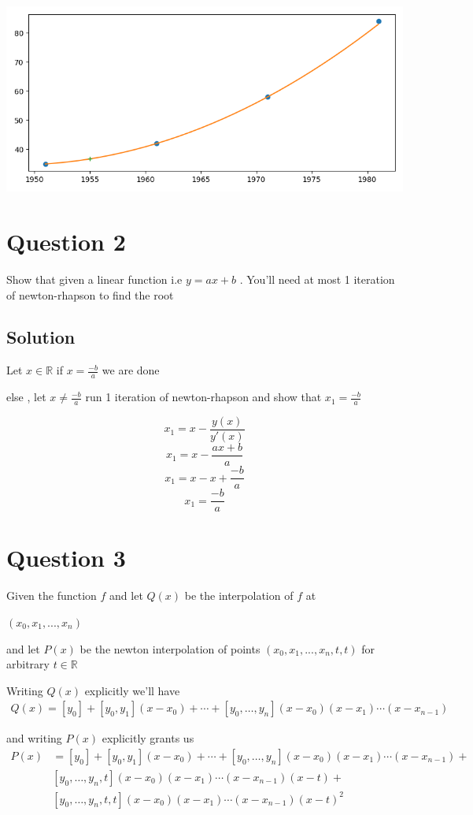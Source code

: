 \documentclass[11pt]{article}
\begin{document}
\begin{center}
\includegraphics[width=.9\linewidth]{question1_a.png}
\end{center}
\section{Question 2}
\label{sec:org7dc9725}
Show that given a linear function i.e \(y = ax+b\) . You'll need at most 1 iteration of newton-rhapson to find the root
\subsection{Solution}
\label{sec:org68fd458}
Let \(x\in \mathbb{R}\) if \(x = \frac{-b}{a}\) we are done

else , let \(x\not = \frac{-b}{a}\) run 1 iteration of newton-rhapson and show that \(x_1=\frac{-b}{a}\)

\[ x_1 = x - \frac{y(x)}{y'(x)} \]
\[ x_1 = x - \frac{ax+b}{a} \]
\[ x_1 = x - x +\frac{-b}{a} \]
\[ x_1 = \frac{-b}{a} \]
\qedsymbol{}

\newpage
\section{Question 3}
\label{sec:orgaaddb0e}
Given the function \(f\) and let \(Q(x)\) be the interpolation of \(f\) at

\((x_0,x_1 , ... , x_n)\)

and let \(P(x)\) be the newton interpolation of points
\((x_0,x_1 , ... , x_n , t ,t )\)
for arbitrary \(t \in \mathbb{R}\)

Writing \(Q(x)\) explicitly we'll have
\begin{align}
Q(x) = [y_0] + [y_0,y_1](x-x_0) + \cdots + [y_0,\ldots,y_n](x-x_0)(x-x_1)\cdots(x-x_{n-1})
\end{align}

and writing \(P(x)\) explicitly grants us
\begin{align*}
P(x) &= [y_0] + [y_0,y_1](x-x_0) + \cdots + [y_0,\ldots,y_n](x-x_0)(x-x_1)\cdots(x-x_{n-1})+ \\
& [y_0,\ldots,y_n , t](x-x_0)(x-x_1)\cdots(x-x_{n-1})(x-t) + \\
& [y_0,\ldots,y_n,t,t](x-x_0)(x-x_1)\cdots(x-x_{n-1})(x-t)^2 \\
\end{align*}
\end{document}
